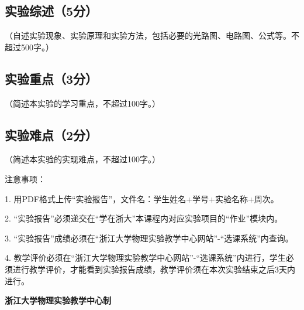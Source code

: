 \documentclass[10pt,a4paper]{ctexart} %
\begin{document}
  \subsection{实验综述（5分）}
  （自述实验现象、实验原理和实验方法，包括必要的光路图、电路图、公式等。不超过500字。）
  \subsection{实验重点（3分）}
  （简述本实验的学习重点，不超过100字。）
  \subsection{实验难点（2分）}
  （简述本实验的实现难点，不超过100字。）

\vspace*{\fill} %
\noindent
\begin{minipage}{\textwidth}
  注意事项：

  \begingroup
    \setlength{\leftskip}{2em} %
    1. 用PDF格式上传“实验报告”，文件名：学生姓名+学号+实验名称+周次。

    2. “实验报告”必须递交在“学在浙大”本课程内对应实验项目的“作业”模块内。

    3. “实验报告”成绩必须在“浙江大学物理实验教学中心网站”-“选课系统”内查询。

    4. 教学评价必须在“浙江大学物理实验教学中心网站”-“选课系统”内进行，学生必须进行教学评价，才能看到实验报告成绩，教学评价须在本次实验结束之后3天内进行。\par
    \endgroup

  \begin{center}
    {\bfseries 浙江大学物理实验教学中心制}
  \end{center}
\end{minipage}
\end{document}
